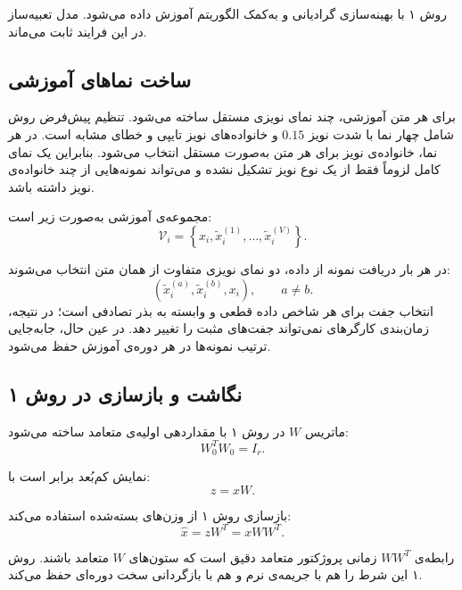 \documentclass[a4paper,12pt]{article}
\newcommand{\EN}[1]{\lr{#1}}
\begin{document}
روش ۱ با بهینه‌سازی گرادیانی و به‌کمک الگوریتم \EN{Adam} آموزش داده می‌شود. مدل تعبیه‌ساز در این فرایند ثابت می‌ماند.

\subsection{ساخت نماهای آموزشی}

برای هر متن آموزشی، چند نمای نویزی مستقل ساخته می‌شود. تنظیم پیش‌فرض روش شامل چهار نما با شدت نویز $0.15$ و خانواده‌های نویز تایپی و خطای مشابه \EN{OCR} است. در هر نما، خانواده‌ی نویز برای هر متن به‌صورت مستقل انتخاب می‌شود. بنابراین یک نمای کامل لزوماً فقط از یک نوع نویز تشکیل نشده و می‌تواند نمونه‌هایی از چند خانواده‌ی نویز داشته باشد.

مجموعه‌ی آموزشی به‌صورت زیر است:
\begin{equation}
 \mathcal{V}_i=
 \left\{
 x_i,
 \tilde{x}_i^{(1)},
 \ldots,
 \tilde{x}_i^{(V)}
 \right\}.
\end{equation}

در هر بار دریافت نمونه از داده، دو نمای نویزی متفاوت از همان متن انتخاب می‌شوند:
\begin{equation}
 \left(\tilde{x}_i^{(a)},\tilde{x}_i^{(b)},x_i\right),
 \qquad a\neq b.
\end{equation}
انتخاب جفت برای هر شاخص داده قطعی و وابسته به بذر تصادفی است؛ در نتیجه، زمان‌بندی کارگرهای \EN{DataLoader} نمی‌تواند جفت‌های مثبت را تغییر دهد. در عین حال، جابه‌جایی ترتیب نمونه‌ها در هر دوره‌ی آموزش حفظ می‌شود.

\subsection{نگاشت و بازسازی در روش ۱}

ماتریس $W$ در روش ۱ با مقداردهی اولیه‌ی متعامد ساخته می‌شود:
\begin{equation}
 W_0^{T}W_0=I_r.
\end{equation}

نمایش کم‌بُعد برابر است با:
\begin{equation}
 z=xW.
\end{equation}

بازسازی روش ۱ از وزن‌های بسته‌شده استفاده می‌کند:
\begin{equation}
 \hat{x}=zW^{T}=xWW^{T}.
\end{equation}

رابطه‌ی $WW^{T}$ زمانی پروژکتور متعامد دقیق است که ستون‌های $W$ متعامد باشند. روش ۱ این شرط را هم با جریمه‌ی نرم و هم با بازگردانی سخت دوره‌ای حفظ می‌کند.
\end{document}
